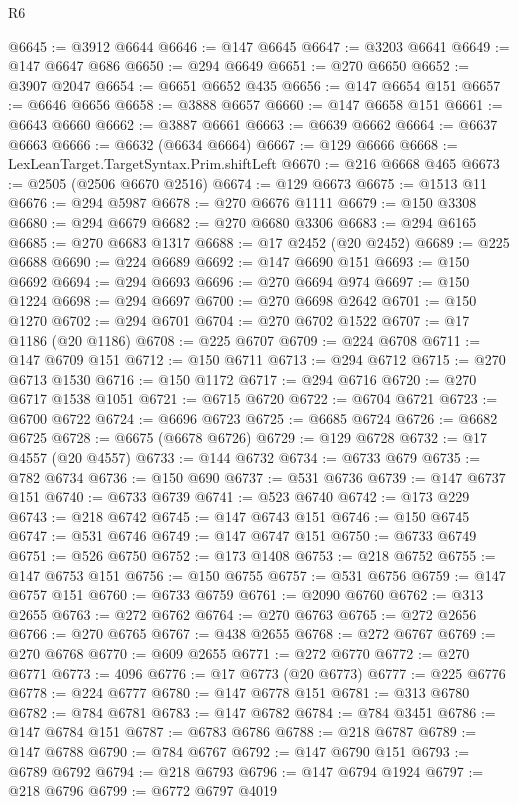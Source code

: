 \begin{lexlean}{R6}
\begin{coremodule}
@6645 := @3912 @6644
@6646 := @147 @6645
@6647 := @3203 @6641
@6649 := @147 @6647 @686
@6650 := @294 @6649
@6651 := @270 @6650
@6652 := @3907 @2047
@6654 := @6651 @6652 @435
@6656 := @147 @6654 @151
@6657 := @6646 @6656
@6658 := @3888 @6657
@6660 := @147 @6658 @151
@6661 := @6643 @6660
@6662 := @3887 @6661
@6663 := @6639 @6662
@6664 := @6637 @6663
@6666 := @6632 (@6634 @6664)
@6667 := @129 @6666
@6668 := LexLeanTarget.TargetSyntax.Prim.shiftLeft
@6670 := @216 @6668 @465
@6673 := @2505 (@2506 @6670 @2516)
@6674 := @129 @6673
@6675 := @1513 @11
@6676 := @294 @5987
@6678 := @270 @6676 @1111
@6679 := @150 @3308
@6680 := @294 @6679
@6682 := @270 @6680 @3306
@6683 := @294 @6165
@6685 := @270 @6683 @1317
@6688 := @17 @2452 (@20 @2452)
@6689 := @225 @6688
@6690 := @224 @6689
@6692 := @147 @6690 @151
@6693 := @150 @6692
@6694 := @294 @6693
@6696 := @270 @6694 @974
@6697 := @150 @1224
@6698 := @294 @6697
@6700 := @270 @6698 @2642
@6701 := @150 @1270
@6702 := @294 @6701
@6704 := @270 @6702 @1522
@6707 := @17 @1186 (@20 @1186)
@6708 := @225 @6707
@6709 := @224 @6708
@6711 := @147 @6709 @151
@6712 := @150 @6711
@6713 := @294 @6712
@6715 := @270 @6713 @1530
@6716 := @150 @1172
@6717 := @294 @6716
@6720 := @270 @6717 @1538 @1051
@6721 := @6715 @6720
@6722 := @6704 @6721
@6723 := @6700 @6722
@6724 := @6696 @6723
@6725 := @6685 @6724
@6726 := @6682 @6725
@6728 := @6675 (@6678 @6726)
@6729 := @129 @6728
@6732 := @17 @4557 (@20 @4557)
@6733 := @144 @6732
@6734 := @6733 @679
@6735 := @782 @6734
@6736 := @150 @690
@6737 := @531 @6736
@6739 := @147 @6737 @151
@6740 := @6733 @6739
@6741 := @523 @6740
@6742 := @173 @229
@6743 := @218 @6742
@6745 := @147 @6743 @151
@6746 := @150 @6745
@6747 := @531 @6746
@6749 := @147 @6747 @151
@6750 := @6733 @6749
@6751 := @526 @6750
@6752 := @173 @1408
@6753 := @218 @6752
@6755 := @147 @6753 @151
@6756 := @150 @6755
@6757 := @531 @6756
@6759 := @147 @6757 @151
@6760 := @6733 @6759
@6761 := @2090 @6760
@6762 := @313 @2655
@6763 := @272 @6762
@6764 := @270 @6763
@6765 := @272 @2656
@6766 := @270 @6765
@6767 := @438 @2655
@6768 := @272 @6767
@6769 := @270 @6768
@6770 := @609 @2655
@6771 := @272 @6770
@6772 := @270 @6771
@6773 := 4096
@6776 := @17 @6773 (@20 @6773)
@6777 := @225 @6776
@6778 := @224 @6777
@6780 := @147 @6778 @151
@6781 := @313 @6780
@6782 := @784 @6781
@6783 := @147 @6782
@6784 := @784 @3451
@6786 := @147 @6784 @151
@6787 := @6783 @6786
@6788 := @218 @6787
@6789 := @147 @6788
@6790 := @784 @6767
@6792 := @147 @6790 @151
@6793 := @6789 @6792
@6794 := @218 @6793
@6796 := @147 @6794 @1924
@6797 := @218 @6796
@6799 := @6772 @6797 @4019

\end{coremodule}
\end{lexlean}
